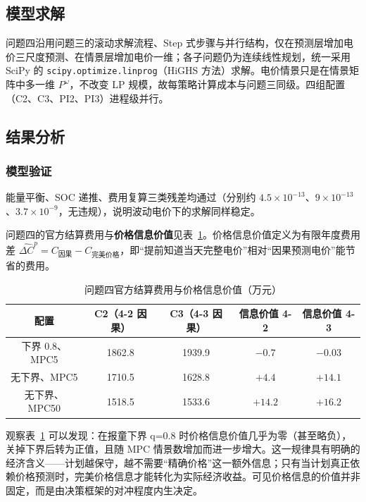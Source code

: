 \subsection{模型求解}

问题四沿用问题三的滚动求解流程、Step 式步骤与并行结构，仅在预测层增加电价三尺度预测、在情景层增加电价一维；各子问题仍为连续线性规划，统一采用 SciPy 的 \texttt{scipy.optimize.linprog}（HiGHS 方法）求解。电价情景只是在情景矩阵中多一维 $P^\omega$，不改变 LP 规模，故每策略计算成本与问题三同级。四组配置（C2、C3、PI2、PI3）进程级并行。

\subsection{结果分析}

\subsubsection{模型验证}

能量平衡、SOC 递推、费用复算三类残差均通过（分别约 $4.5\times10^{-13}$、$9\times10^{-13}$、$3.7\times10^{-9}$，无违规），说明波动电价下的求解同样稳定。

问题四的官方结算费用与\textbf{价格信息价值}见表~\ref{tab:info4}。价格信息价值定义为有限年度费用差 $\widehat{\Delta C}^p=C_{\text{因果}}-C_{\text{完美价格}}$，即“提前知道当天完整电价”相对“因果预测电价”能节省的费用。

\begin{table}[htbp]
\centering
\caption{问题四官方结算费用与价格信息价值（万元）}
\label{tab:info4}
\begin{tabular}{ccccc}
\toprule
配置 & C2（4-2 因果） & C3（4-3 因果） & 信息价值 4-2 & 信息价值 4-3 \\
\midrule
下界 0.8、MPC5 & 1862.8 & 1939.9 & $-0.7$ & $-0.03$ \\
无下界、MPC5 & 1710.5 & 1628.8 & $+4.4$ & $+14.1$ \\
无下界、MPC50 & 1518.5 & 1533.6 & $+14.2$ & $+16.2$ \\
\bottomrule
\end{tabular}
\end{table}

观察表~\ref{tab:info4} 可以发现：在报童下界 q=0.8 时价格信息价值几乎为零（甚至略负），关掉下界后转为正值，且随 MPC 情景数增加而进一步增大。这一规律具有明确的经济含义——计划越保守，越不需要“精确价格”这一额外信息；只有当计划真正依赖价格预测时，完美价格信息才能转化为实际经济收益。可见价格信息的价值并非固定，而是由决策框架的对冲程度内生决定。


